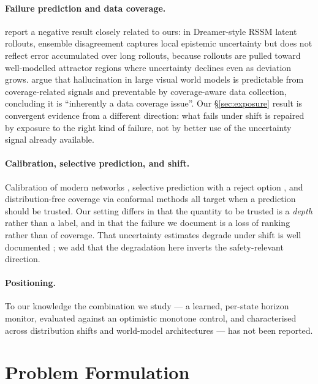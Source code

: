 \documentclass[twocolumn,10pt]{article}
\begin{document}
\paragraph{Failure prediction and data coverage.}
\citet{berger2026biased} report a negative result closely related to ours: in Dreamer-style
RSSM latent rollouts, ensemble disagreement captures local epistemic uncertainty but does not
reflect error accumulated over long rollouts, because rollouts are pulled toward well-modelled
attractor regions where uncertainty declines even as deviation grows. \citet{hansen2026hallucination} argue that hallucination in large visual world models is predictable from
coverage-related signals and preventable by coverage-aware data collection, concluding it is
``inherently a data coverage issue''. Our \S\ref{sec:exposure} result is convergent evidence
from a different direction: what fails under shift is repaired by exposure to the right kind of
failure, not by better use of the uncertainty signal already available.

\paragraph{Calibration, selective prediction, and shift.}
Calibration of modern networks \citep{guo2017calibration}, selective prediction with a reject
option \citep{geifman2017selective}, and distribution-free coverage via conformal methods
\citep{angelopoulos2021conformal} all target when a prediction should be trusted. Our setting
differs in that the quantity to be trusted is a \emph{depth} rather than a label, and in that
the failure we document is a loss of ranking rather than of coverage. That uncertainty
estimates degrade under shift is well documented \citep{ovadia2019trust,hendrycks2017baseline};
we add that the degradation here inverts the safety-relevant direction.

\paragraph{Positioning.} To our knowledge the combination we study --- a learned, per-state
horizon monitor, evaluated against an optimistic monotone control, and characterised across
distribution shifts and world-model architectures --- has not been reported.

\section{Problem Formulation}
\label{sec:problem}
\end{document}
